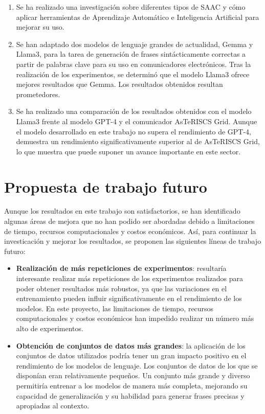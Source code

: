 \documentclass[11pt,spanish,listoffigures,listoftables]{tfgetsinf}
\begin{document}
\begin{enumerate}
	\item Se ha realizado una investigación sobre diferentes tipos de SAAC y cómo aplicar herramientas de Aprendizaje Automático e Inteligencia Artificial para mejorar su uso.
	\item Se han adaptado dos modelos de lenguaje grandes de actualidad, Gemma y Llama3, para la tarea de generación de frases sintácticamente correctas a partir de palabras clave para su uso en comunicadores electrónicos. Tras la realización de los experimentos, se determinó que el modelo Llama3 ofrece mejores resultados que Gemma. Los resultados obtenidos resultan prometedores.
	\item Se ha realizado una comparación de los resultados obtenidos con el modelo Llama3 frente al modelo GPT-4 y el comunicador AsTeRISCS Grid. Aunque el modelo desarrollado en este trabajo no supera el rendimiento de GPT-4, demuestra un rendimiento significativamente superior al de AsTeRISCS Grid, lo que muestra que puede suponer un avance importante en este sector.
\end{enumerate}

\section{Propuesta de trabajo futuro}

Aunque los resultados en este trabajo son satisfactorios, se han identificado algunas áreas de mejora que no han podido ser abordadas debido a limitaciones de tiempo, recursos computacionales y costos económicos. Así, para continuar la investicación y mejorar los resultados, se proponen las siguientes líneas de trabajo futuro:

\begin{itemize}
	\item \textbf{Realización de más repeticiones de experimentos}: resultaría interesante realizar más repeticiones de los experimentos realizados para poder obtener resultados más robustos, ya que las variaciones en el entrenamiento pueden influir significativamente en el rendimiento de los modelos. En este proyecto, las limitaciones de tiempo, recursos computacionales y costos económicos han impedido realizar un número más alto de experimentos.
	\item \textbf{Obtención de conjuntos de datos más grandes}: la aplicación de los conjuntos de datos utilizados podría tener un gran impacto positivo en el rendimiento de los modelos de lenguaje. Los conjuntos de datos de los que se disponían eran relativamente pequeños. Un conjunto más grande y diverso permitiría entrenar a los modelos de manera más completa, mejorando su capacidad de generalización y su habilidad para generar frases precisas y apropiadas al contexto.
\end{itemize}
\end{document}
